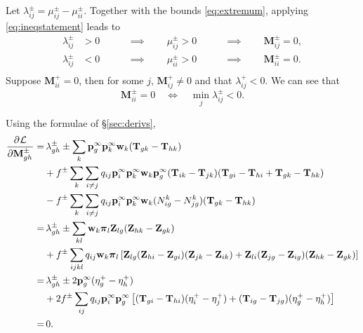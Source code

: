 \documentclass[12pt]{article}
\newcommand{\means}{\Longleftrightarrow}
\newcommand{\M}{\mathbf{M}}
\newcommand{\pp}{\mathbf{p}^\infty}
\newcommand{\T}{\mathbf{T}}
\newcommand{\Zb}{\mathbf{Z}}
\newcommand{\w}{\mathbf{w}}
\newcommand{\pib}{\boldsymbol{\pi}}
\begin{document}
Let $\lambda^\pm_{ij} = \mu^\pm_{ij} - \mu^\pm_{ii}$. Together with the bounds \eqref{eq:extremum}, applying \eqref{eq:ineqstatement} leads to
%
\begin{equation}\label{eq:lambdaineqs}
  \begin{aligned}
    \lambda^\pm_{ij}  &> 0
    \qquad &\implies \qquad
    \mu^\pm_{ij} > 0
    \qquad &\implies \qquad
    \M^\pm_{ij} = 0, \\
    \lambda^\pm_{ij}  &< 0
    \qquad &\implies \qquad
    \mu^\pm_{ii} > 0
    \qquad &\implies \qquad
    \M^\pm_{ii} = 0. \\
  \end{aligned}
\end{equation}
%
Suppose $\M^+_{ii}=0$, then for some $j$, $\M^+_{ij}\neq0$ and that $\lambda^+_{ij}<0$. We can see that
%
\begin{equation}\label{eq:lambdadiagineq}
  \M^\pm_{ii}=0 \quad\means\quad \min_j \lambda^\pm_{ij} <0.
\end{equation}
%


Using the formulae of \S\ref{sec:derivs},
%
\begin{equation}\label{eq:lagrangderiv}
  \begin{aligned}
    \pdiff{\CL}{\M^\pm_{gh}} =&\, \lambda^\pm_{gh}
    \pm \sum_k \pp_g \pp_k \w_k (\T_{gk} - \T_{hk}) \\
      &+ f^\pm \sum_k \sum_{i \neq j} q_{ij} \pp_i \pp_k \w_k \pp_g
         (\T_{ik} - \T_{jk}) (\T_{gi} - \T_{hi} + \T_{gk} - \T_{hk})\\
      &- f^\pm \sum_k \sum_{i \neq j} q_{ij} \pp_i \pp_k \w_k
         (N^k_{ig} - N^k_{jg}) (\T_{gk} - \T_{hk})\\
    =&\, \lambda^\pm_{gh}
    \pm \sum_{kl} \w_k \pib_l \Zb_{lg} (\Zb_{hk} - \Zb_{gk}) \\
      &+ f^\pm \sum_{ijkl} q_{ij} \w_k \pib_l \brk{
         \Zb_{lg}(\Zb_{hi}-\Zb_{gi})(\Zb_{jk}-\Zb_{ik}) + \Zb_{li}(\Zb_{jg}-\Zb_{ig})(\Zb_{hk}-\Zb_{gk}) } \\
    =&\, \lambda^\pm_{gh}
    \pm 2 \pp_g (\eta^+_g - \eta^+_h) \\
      &+ 2f^\pm \sum_{ij} q_{ij} \pp_i \pp_g \brk{
         (\T_{gi}-\T_{hi})(\eta^+_{i}-\eta^+_{j}) +
         (\T_{ig}-\T_{jg})(\eta^+_{g}-\eta^+_{h}) } \\
    =& \, 0.
  \end{aligned}
\end{equation}
%
\end{document}
